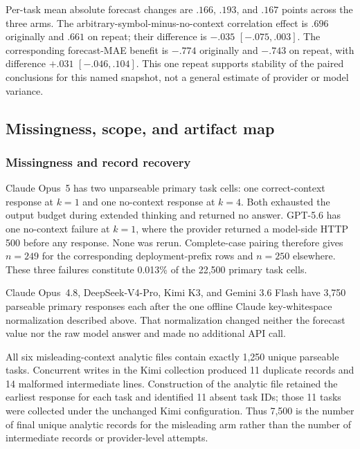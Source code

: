 \begin{center}
\begin{minipage}{\linewidth}
\centering
{}
\label{tab:coin-city-gpt-repeat}
\scriptsize
\setlength{\tabcolsep}{2.5pt}
\resizebox{\linewidth}{!}{}
\end{minipage}
\end{center}

Per-task mean absolute forecast changes are \(.166\), \(.193\), and \(.167\)
points across the three arms. The arbitrary-symbol-minus-no-context correlation
effect is \(.696\) originally and \(.661\) on repeat; their difference is
\(-.035\) \([-.075,.003]\). The corresponding forecast-MAE benefit is
\(-.774\) originally and \(-.743\) on repeat, with difference \(+.031\)
\([-.046,.104]\). This one repeat supports stability of the paired conclusions
for this named snapshot, not a general estimate of provider or model variance.

\subsection{Missingness, scope, and artifact map}
\label{app:coin-city-limitations}

\subsubsection{Missingness and record recovery}
Claude Opus~5 has two unparseable primary task cells: one correct-context response
at \(k=1\) and one no-context response at \(k=4\). Both exhausted the output
budget during extended thinking and returned no answer. GPT-5.6 has one
no-context failure at \(k=1\), where the provider returned a model-side HTTP 500
before any response. None was rerun. Complete-case pairing therefore gives
\(n=249\) for the corresponding deployment-prefix rows and \(n=250\) elsewhere.
These three failures constitute 0.013\% of the 22,500 primary task cells.

Claude Opus~4.8, DeepSeek-V4-Pro, Kimi K3, and Gemini 3.6 Flash have 3,750
parseable primary responses each after the one offline Claude key-whitespace
normalization described above. That normalization changed neither the forecast
value nor the raw model answer and made no additional API call.

All six misleading-context analytic files contain exactly 1,250 unique parseable
tasks. Concurrent writes in the Kimi collection produced 11 duplicate records and
14 malformed intermediate lines. Construction of the analytic file retained the
earliest response for each task and identified 11 absent task IDs; those 11 tasks
were collected under the unchanged Kimi configuration. Thus 7,500 is the number
of final unique analytic records for the misleading arm rather than the number of
intermediate records or provider-level attempts.

